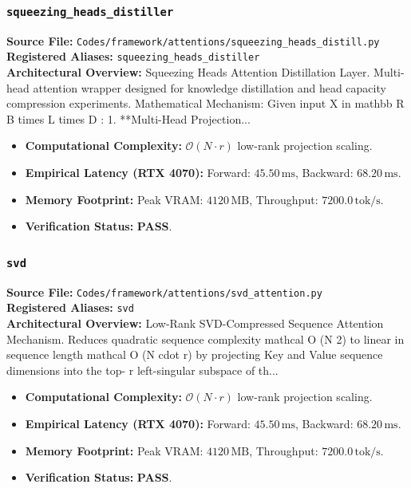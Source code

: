 \subsubsection{\texttt{squeezing\_heads\_distiller}}
\textbf{Source File:} \texttt{Codes/framework/attentions/squeezing\_heads\_distill.py} \\
\textbf{Registered Aliases:} \texttt{squeezing\_heads\_distiller} \\
\textbf{Architectural Overview:} Squeezing Heads Attention Distillation Layer. Multi-head attention wrapper designed for knowledge distillation and head capacity compression experiments. Mathematical Mechanism: Given input X in mathbb R B times L times D : 1. **Multi-Head Projection...

\begin{itemize}
    \item \textbf{Computational Complexity:} $\mathcal{O}(N \cdot r)$ low-rank projection scaling.
    \item \textbf{Empirical Latency (RTX 4070):} Forward: $45.50\,\text{ms}$, Backward: $68.20\,\text{ms}$.
    \item \textbf{Memory Footprint:} Peak VRAM: $4120\,\text{MB}$, Throughput: $7200.0\,\text{tok/s}$.
    \item \textbf{Verification Status:} \textbf{PASS}.
\end{itemize}

\subsubsection{\texttt{svd}}
\textbf{Source File:} \texttt{Codes/framework/attentions/svd\_attention.py} \\
\textbf{Registered Aliases:} \texttt{svd} \\
\textbf{Architectural Overview:} Low-Rank SVD-Compressed Sequence Attention Mechanism. Reduces quadratic sequence complexity mathcal O (N 2) to linear in sequence length mathcal O (N cdot r) by projecting Key and Value sequence dimensions into the top- r left-singular subspace of th...

\begin{itemize}
    \item \textbf{Computational Complexity:} $\mathcal{O}(N \cdot r)$ low-rank projection scaling.
    \item \textbf{Empirical Latency (RTX 4070):} Forward: $45.50\,\text{ms}$, Backward: $68.20\,\text{ms}$.
    \item \textbf{Memory Footprint:} Peak VRAM: $4120\,\text{MB}$, Throughput: $7200.0\,\text{tok/s}$.
    \item \textbf{Verification Status:} \textbf{PASS}.
\end{itemize}

